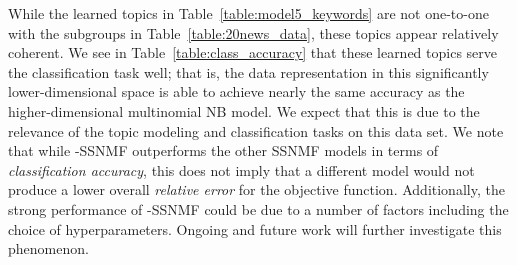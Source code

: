 \documentclass[twocolumn,10pt]{article}
\begin{document}
While the learned topics in Table~\ref{table:model5_keywords} are not one-to-one with the subgroups in Table~\ref{table:20news_data}, these topics appear relatively coherent.  We see in Table~\ref{table:class_accuracy} that these learned topics serve the classification task well; that is, the data representation in this significantly lower-dimensional space is able to achieve nearly the same accuracy as the higher-dimensional multinomial NB model.  We expect that this is due to the relevance of the topic modeling and classification tasks on this data set.  We note that while -SSNMF outperforms the other SSNMF models in terms of \textit{classification accuracy}, this does not imply that a different model would not produce a lower overall \emph{relative error} for the objective function.  Additionally, the strong performance of -SSNMF could be due to a number of factors including the choice of hyperparameters. Ongoing and future work will further investigate this phenomenon.


\begin{table*}[htb]
\caption{Top keywords representing each topic of the -SSNMF model referred to in Figure~\ref{fig:SSNMF_Model5}.}
\label{table:model5_keywords}
\end{table*} 
\end{document}
